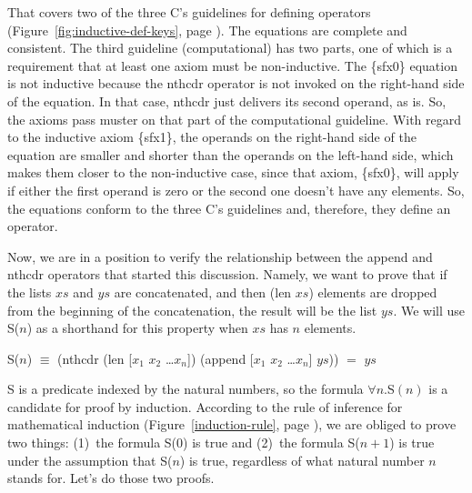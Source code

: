 That covers two of the three C's guidelines for defining operators
(Figure~\ref{fig:inductive-def-keys}, page \pageref{fig:inductive-def-keys}).
The equations are complete and consistent.
The third guideline (computational) has two parts, one of which is
a requirement that at least one axiom must be non-inductive.
The \{sfx0\} equation is not inductive because the nthcdr operator
is not invoked on the right-hand side of the equation.
In that case, nthcdr just delivers its second operand, as is.
So, the axioms pass muster on that part of the computational guideline.
With regard to the inductive axiom \{sfx1\},
the operands on the right-hand side of the equation are
smaller and shorter than the operands on the left-hand side,
which makes them closer to the non-inductive case,
since that axiom, \{sfx0\}, will apply if either the first
operand is zero or the second one doesn't have any elements.
So, the equations conform to the three C's guidelines and,
therefore, they define an operator.

Now, we are in a position to verify the relationship
between the append and nthcdr operators that started this discussion.
Namely, we want to prove that if the lists $xs$ and $ys$ are concatenated,
and then (len $xs$) elements are dropped from the beginning of the
concatenation, the result will be the list $ys$.
We will use S($n$) as a shorthand for this property
when $xs$ has $n$ elements.

\begin{samepage}
\begin{center}
\label{append-prefix-thm-predicate}
S($n$) $\equiv$ (nthcdr (len [$x_1$ $x_2$ \dots $x_n$]) (append [$x_1$ $x_2$ \dots $x_n$] $ys$)) $=$ $ys$
\end{center}
\end{samepage}


\label{append-suffix-thm-pencil-proof} 
S is a predicate indexed by the natural numbers,
so the formula $\forall n.$S$(n)$ is a candidate for proof by induction.
According to the rule of inference for mathematical induction
(Figure~\ref{induction-rule}, page \pageref{induction-rule}),
we are obliged to prove two things:
(1)~the formula S(0) is true and
(2)~the formula S($n+1$) is true under the assumption that S($n$) is true,
regardless of what natural number $n$ stands for. Let's do those two proofs.

